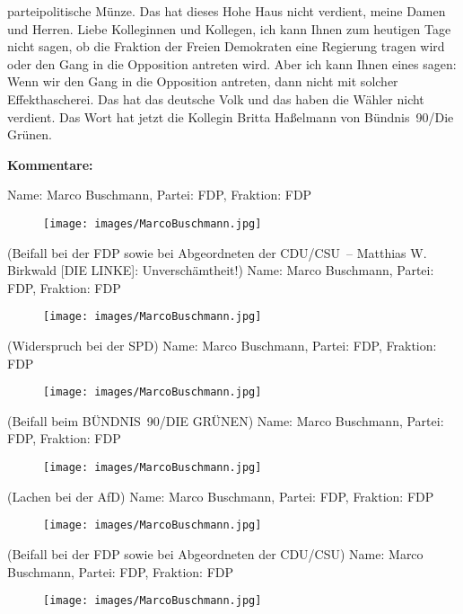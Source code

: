 \documentclass[10pt, a4paper]{report}
\begin{document}
parteipolitische Münze. Das hat dieses Hohe Haus nicht verdient, meine Damen und Herren. Liebe Kolleginnen und Kollegen, ich kann Ihnen zum heutigen Tage nicht sagen, ob die Fraktion der Freien Demokraten eine Regierung tragen wird oder den Gang in die Opposition antreten wird. Aber ich kann Ihnen eines sagen: Wenn wir den Gang in die Opposition antreten, dann nicht mit solcher Effekthascherei. Das hat das deutsche Volk und das haben die Wähler nicht verdient. Das Wort hat jetzt die Kollegin Britta Haßelmann von Bündnis 90/Die Grünen. 

\textbf{Kommentare:}

Name: Marco Buschmann, Partei: FDP, Fraktion: FDP

\begin{figure}[!ht]
\texttt{[image: images/MarcoBuschmann.jpg]}
\end{figure}


(Beifall bei der FDP sowie bei Abgeordneten der CDU/CSU – Matthias W. Birkwald [DIE LINKE]: Unverschämtheit!)
Name: Marco Buschmann, Partei: FDP, Fraktion: FDP

\begin{figure}[!ht]
\texttt{[image: images/MarcoBuschmann.jpg]}
\end{figure}


(Widerspruch bei der SPD)
Name: Marco Buschmann, Partei: FDP, Fraktion: FDP

\begin{figure}[!ht]
\texttt{[image: images/MarcoBuschmann.jpg]}
\end{figure}


(Beifall beim BÜNDNIS 90/DIE GRÜNEN)
Name: Marco Buschmann, Partei: FDP, Fraktion: FDP

\begin{figure}[!ht]
\texttt{[image: images/MarcoBuschmann.jpg]}
\end{figure}


(Lachen bei der AfD)
Name: Marco Buschmann, Partei: FDP, Fraktion: FDP

\begin{figure}[!ht]
\texttt{[image: images/MarcoBuschmann.jpg]}
\end{figure}


(Beifall bei der FDP sowie bei Abgeordneten der CDU/CSU)
Name: Marco Buschmann, Partei: FDP, Fraktion: FDP

\begin{figure}[!ht]
\texttt{[image: images/MarcoBuschmann.jpg]}
\end{figure}
\end{document}
